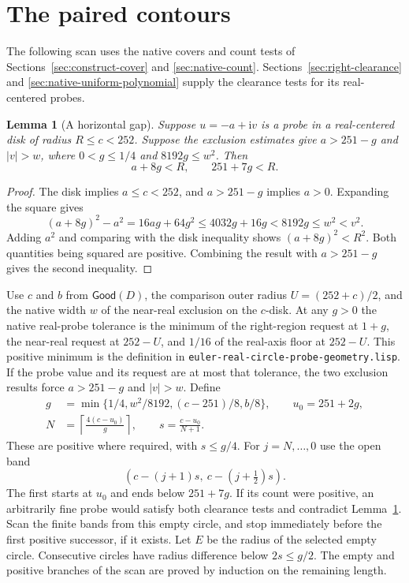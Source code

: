 \documentclass[11pt]{amsart}
\newtheorem{lemma}[theorem]{Lemma}
\theoremstyle{definition}
\theoremstyle{remark}
\numberwithin{equation}{section}
\newcommand{\Good}{\mathsf{Good}}
\newcommand{\code}[1]{\nolinkurl{#1}}
\begin{document}
\section{The paired contours}
\label{sec:contour}

The following scan uses the native covers and count tests of
Sections~\ref{sec:construct-cover} and \ref{sec:native-count}.
Sections~\ref{sec:right-clearance} and
\ref{sec:native-uniform-polynomial} supply the clearance tests for
its real-centered probes.

\begin{lemma}[A horizontal gap]\label{lem:horizontal}
Suppose $u=-a+\mathrm i v$ is a probe in a real-centered disk of
radius $R\le c<252$. Suppose the exclusion estimates give
$a>251-g$ and $|v|>w$, where $0<g\le1/4$ and $8192g\le w^2$.
Then
\[
 a+8g<R,\qquad 251+7g<R.
\]
\end{lemma}
\begin{proof}
The disk implies $a\le c<252$, and $a>251-g$ implies $a>0$.
Expanding the square gives
\[
 (a+8g)^2-a^2=16ag+64g^2
       \le 4032g+16g<8192g\le w^2<v^2.
\]
Adding $a^2$ and comparing with the disk inequality shows
$(a+8g)^2<R^2$. Both quantities being squared are positive.
Combining the result with $a>251-g$ gives the second inequality.
\end{proof}

Use $c$ and $b$ from $\Good(D)$, the comparison outer radius
$U=(252+c)/2$, and the native width $w$ of the near-real
exclusion on the $c$-disk. At any $g>0$ the native real-probe
tolerance is the minimum of the right-region request at $1+g$,
the near-real request at $252-U$, and $1/16$ of the real-axis
floor at $252-U$. This positive minimum is the definition
in \code{euler-real-circle-probe-geometry.lisp}. If the
probe value and its request are at most that tolerance,
the two exclusion results force $a>251-g$ and $|v|>w$.
Define
\begin{align*}
 g &= \min\{1/4,w^2/8192,(c-251)/8,b/8\}, \qquad u_0=251+2g,\\
 N &= \left\lceil\frac{4(c-u_0)}g\right\rceil,\qquad
 s = \frac{c-u_0}{N+1}.
\end{align*}
These are positive where required, with $s\le g/4$. For
$j=N,\ldots,0$ use the open band
\[
       (c-(j+1)s,\ c-(j+\tfrac12)s).
\]
The first starts at $u_0$ and ends below $251+7g$. If its
count were positive, an arbitrarily fine probe would satisfy
both clearance tests and contradict Lemma~\ref{lem:horizontal}.
Scan the finite bands from this empty circle, and stop
immediately before the first positive successor, if it exists.
Let $E$ be the radius of the selected empty circle. Consecutive
circles have radius difference below $2s\le g/2$.
The empty and positive branches of the scan are proved by
induction on the remaining length.
\end{document}

